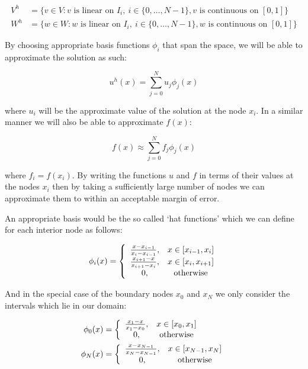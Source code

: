 \begin{align*}
    V^h &= \{v \in V: v \text{ is linear on } I_i,
          \ i \in \{0, \ldots, N - 1\},
          v \text{ is continuous on } [0, 1]\} \\
    W^h &= \{w \in W: w \text{ is linear on } I_i,
          \ i \in \{0, \ldots, N - 1\},
          w \text{ is continuous on } [0, 1]\}
\end{align*}

By choosing appropriate basis functions $\phi_i$ that span the space, we will
be able to approximate the solution as such:

\begin{equation}\label{eq:one-d-approx-soln}
    u^h(x) = \sum_{j = 0}^N{u_j\phi_j(x)}
\end{equation}

where $u_i$ will be the approximate value of the solution at the node $x_i$. In
a similar manner we will also be able to approximate $f(x)$:

\begin{equation}
    f(x) \approx \sum_{j = 0}^N f_j\phi_j(x)
\end{equation}

where $f_i = f(x_i)$. By writing the functions $u$ and $f$ in terms of their
values at the nodes $x_i$ then by taking a sufficiently large number of nodes
we can approximate them to within an acceptable margin of error.

An appropriate basis would be the so called `hat functions' which we can define
for each interior node as follows:

\begin{equation}\label{eq:one-d-hat-basis}
    \phi_i(x) = \left\{\begin{array}{c c}
                    \frac{x - x_{i-1}}{x_i - x_{i - 1}}, & x \in [x_{i-1}, x_i] \\
                    \frac{x_{i+1} - x}{x_{i + 1} - x_i}, & x \in [x_i, x_{i + 1}] \\
                    0, & \text{otherwise}
                \end{array}\right.
\end{equation}

And in the special case of the boundary nodes $x_0$ and $x_N$ we only consider
the intervals which lie in our domain:

\begin{align}
    \phi_0(x) &= \left\{\begin{array}{c c}
                    \frac{x_1 - x}{x_1 - x_0}, & x \in [x_0, x_1] \\
                    0, & \text{otherwise}
    \end{array}\right.
    \\
    \phi_N(x) &= \left\{\begin{array}{c c}
                    \frac{x - x_{N - 1}}{x_N - x_{N-1}}, & x \in [x_{N-1}, x_N] \\
                    0, & \text{otherwise}
    \end{array}\right.
\end{align}

